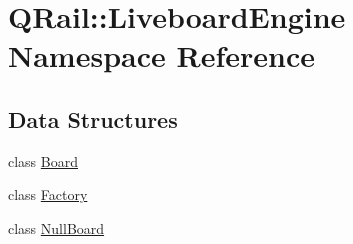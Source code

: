 \hypertarget{namespaceQRail_1_1LiveboardEngine}{}\section{Q\+Rail\+::Liveboard\+Engine Namespace Reference}
\label{namespaceQRail_1_1LiveboardEngine}
\subsection*{Data Structures}
\begin{DoxyCompactItemize}
\item 
class \mbox{\hyperlink{classQRail_1_1LiveboardEngine_1_1Board}{Board}}
\item 
class \mbox{\hyperlink{classQRail_1_1LiveboardEngine_1_1Factory}{Factory}}
\item 
class \mbox{\hyperlink{classQRail_1_1LiveboardEngine_1_1NullBoard}{Null\+Board}}
\end{DoxyCompactItemize}
